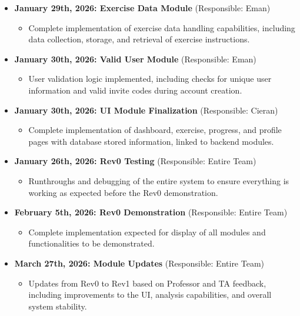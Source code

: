 \documentclass[12pt, titlepage]{article}
\begin{document}
\begin{itemize}
    \item \textbf{January 29th, 2026: Exercise Data Module} (Responsible: Eman)
    \begin{itemize}
        \item Complete implementation of exercise data handling capabilities, including data collection, storage, and retrieval of exercise instructions.
    \end{itemize}

    \item \textbf{January 30th, 2026: Valid User Module} (Responsible: Eman)
    \begin{itemize}
        \item User validation logic implemented, including checks for unique user information and valid invite codes during account creation.
    \end{itemize}

    \item \textbf{January 30th, 2026: UI Module Finalization} (Responsible: Cieran)
    \begin{itemize}
        \item Complete implementation of dashboard, exercise, progress, and profile pages with database stored information, linked to backend modules.
    \end{itemize}

    \item \textbf{January 26th, 2026: Rev0 Testing} (Responsible: Entire Team)
    \begin{itemize}
        \item Runthroughs and debugging of the entire system to ensure everything is working as expected before the Rev0 demonstration.
    \end{itemize}

    \item \textbf{February 5th, 2026: Rev0 Demonstration} (Responsible: Entire Team)
    \begin{itemize}
        \item Complete implementation expected for display of all modules and functionalities to be demonstrated.
    \end{itemize}

    \item \textbf{March 27th, 2026: Module Updates} (Responsible: Entire Team)
    \begin{itemize}
        \item Updates from Rev0 to Rev1 based on Professor and TA feedback, including improvements to the UI, analysis capabilities, and overall system stability.
    \end{itemize}


\end{itemize}
\end{document}
